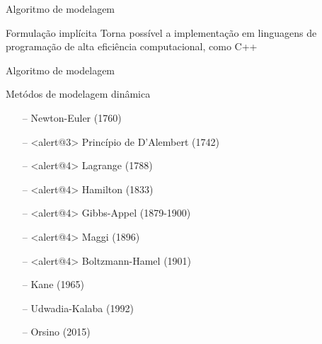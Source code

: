 \documentclass[25pt,landscape]{beamer}
\begin{document}
\begin{frame}{Algoritmo de modelagem}
    \pause
    \begin{block}{Formula\c{c}\~ao impl\'icita}
        Torna poss\'ivel a implementa\c{c}\~ao em linguagens de programa\c{c}\~ao de alta efici\^encia computacional, como C++
    \end{block}
\end{frame}

\begin{frame}{Algoritmo de modelagem}
    \begin{block}{Met\'odos de modelagem din\^amica}
        \pause
        \begin{itemize}
            \item[--] Newton-Euler (1760)  \\[4pt]
            \item[--] <alert@3> Princ\'ipio de D'Alembert (1742) \\[4pt]
            \item[--] <alert@4> Lagrange (1788) \\[4pt]
            \item[--] <alert@4> Hamilton (1833) \\[4pt]
            \item[--] <alert@4> Gibbs-Appel (1879-1900) \\[4pt]
            \item[--] <alert@4> Maggi (1896) \\[4pt]
            \item[--] <alert@4> Boltzmann-Hamel (1901) \\[4pt]
            \item[--] Kane (1965) \\[4pt]
            \item[--] Udwadia-Kalaba (1992) \\[4pt]
            \item[--] Orsino (2015) \\[4pt]
        \end{itemize}
    \end{block}
\end{frame}
\end{document}
